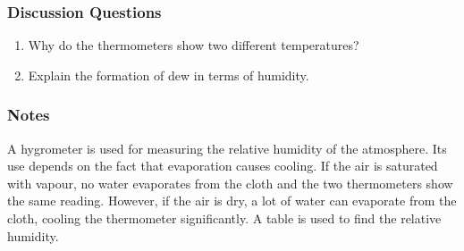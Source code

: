 \subsubsection*{Discussion Questions}
\begin{enumerate}
\item{Why do the thermometers show two different temperatures?}
\item{Explain the formation of dew in terms of humidity.}
\end{enumerate}

\subsubsection*{Notes}
A hygrometer is used for measuring the relative humidity of the atmosphere.  Its use depends on the fact that evaporation causes cooling.  If the air is saturated with vapour, no water evaporates from the cloth and the two thermometers show the same reading.  However, if the air is dry, a lot of water can evaporate from the cloth, cooling the thermometer significantly.  A table is used to find the relative humidity.
